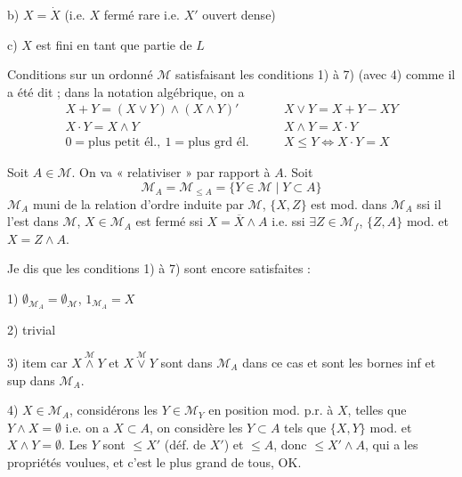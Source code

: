 \documentclass[11pt,a4paper]{article}
\begin{document}
b) $X = \dot{X}$ \quad (i.e. $X$ fermé rare i.e. $X'$ ouvert dense)

c) $X$ est fini en tant que partie de $L$

Conditions sur un ordonné $\mathcal{M}$ satisfaisant les conditions 1) à 7) (avec 4) \ill{}  comme il a été dit ; dans la notation algébrique, on a
\[
  \begin{array}{ll}
    X + Y = (X \vee Y) \wedge (X \wedge Y)' & \qquad X \vee Y = X + Y - XY \\
    X \cdot Y = X \wedge Y & \qquad X \wedge Y = X \cdot Y \\
    0 = \text{plus petit él.}, \ 1 = \text{plus grd él.} & \qquad X \leq Y \iff X \cdot Y = X
  \end{array}
\]

Soit $A \in \mathcal{M}$. On va « relativiser » \struck{\ill{}} par rapport à $A$. Soit 
\[
  \mathcal{M}_A = \mathcal{M}_{\leq A} = \{ Y \in \mathcal{M} \mid Y \subset A \}
\]
$\mathcal{M}_A$ muni de la relation d'ordre induite par $\mathcal{M}$, $\{X, Z\}$ est mod. dans $\mathcal{M}_A$ ssi il l'est dans $\mathcal{M}$, $X \in \mathcal{M}_A$ est fermé ssi $X = \overline{X} \wedge A$ i.e. ssi $\exists Z \in \mathcal{M}_f$, $\{Z, A\}$ mod. et $X = Z \wedge A$.

Je dis que les conditions 1) à 7) sont encore satisfaites :

1) $\emptyset_{\mathcal{M}_A} = \emptyset_{\mathcal{M}}$, $1_{\mathcal{M}_A} = X$

2) \struck{\ill{}} trivial

3) item car \struck{\ill{}} $X \overset{\mathcal{M}}{\wedge} Y$ et $X \overset{\mathcal{M}}{\vee} Y$ sont dans $\mathcal{M}_A$ dans ce cas et sont les bornes inf et sup dans $\mathcal{M}_A$.

4)  $X \in \mathcal{M}_A$, considérons les $Y \in \mathcal{M}_Y$ en position mod. p.r. à $X$, telles que $Y \wedge X = \emptyset$ i.e. \struck{\ill{}} on a $X \subset A$, on considère les $Y \subset A$ tels que $\{X, Y\}$ mod. et $X \wedge Y = \emptyset$. Les $Y$ sont $\leq X'$ (déf. de $X'$) et $\leq A$, donc $\leq X' \wedge A$, qui a les propriétés voulues, et c'est le plus grand de tous, OK.
\end{document}
